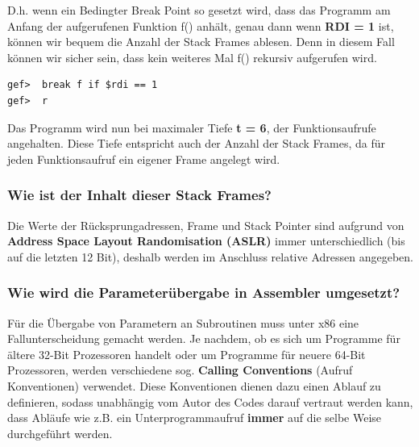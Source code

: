 \documentclass[12pt]{article}
\begin{document}
D.h. wenn ein Bedingter Break Point so gesetzt wird, dass das Programm am Anfang der aufgerufenen Funktion f() anhält, genau dann wenn \textbf{RDI = 1} ist, können wir bequem die Anzahl der Stack Frames ablesen. Denn in diesem Fall können wir sicher sein, dass kein weiteres Mal f() rekursiv aufgerufen wird.

\begin{lstlisting}
gef>  break f if $rdi == 1
gef>  r
\end{lstlisting}

Das Programm wird nun bei maximaler Tiefe \textbf{t = 6}, der Funktionsaufrufe angehalten. Diese Tiefe entspricht auch der Anzahl der Stack Frames, da für jeden Funktionsaufruf ein eigener Frame angelegt wird.


\subsubsection{Wie ist der Inhalt dieser Stack Frames?}
Die Werte der Rücksprungadressen, Frame und Stack Pointer sind aufgrund von \textbf{Address Space Layout Randomisation (ASLR)} immer unterschiedlich (bis auf die letzten 12 Bit), deshalb werden im Anschluss relative Adressen angegeben.





\subsubsection{Wie wird die Parameterübergabe in Assembler umgesetzt?}
\label{sec:calling_convention}
Für die Übergabe von Parametern an Subroutinen muss unter x86 eine Fallunterscheidung gemacht werden. Je nachdem, ob es sich um Programme für ältere 32-Bit Prozessoren handelt oder um Programme für neuere 64-Bit Prozessoren, werden verschiedene sog. \textbf{Calling Conventions} (Aufruf Konventionen) verwendet. Diese Konventionen dienen dazu einen Ablauf zu definieren, sodass unabhängig vom Autor des Codes darauf vertraut werden kann, dass Abläufe wie z.B. ein Unterprogrammaufruf \textbf{immer} auf die selbe Weise durchgeführt werden.
\end{document}
